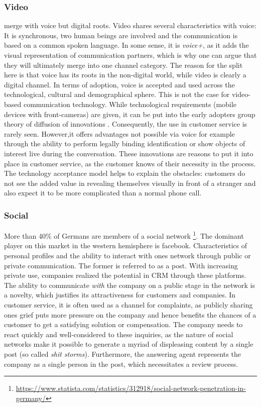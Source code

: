 		\subsubsection{Video}
		merge with voice but digital roots. 
		Video shares several characteristics with voice: It is synchronous, two human beings are involved and the communication is based on a common spoken language. In some sense, it is \textit{voice+}, as it adds the visual representation of communication partners, which is why one can argue that they will ultimately merge into one channel category. The reason for the split here is that voice has its roots in the non-digital world, while video is clearly a digital channel. In terms of adoption, voice is accepted and used across the technological, cultural and demographical sphere. This is not the case for video-based communication technology. While technological requirements (\ie mobile devices with front-cameras)  are given, it can be put into the early adopters group \wrt theory of diffusion of innovations \citep{rogers2010diffusion}. Consequently, the use in customer service is rarely seen. However,it offers advantages not possible via voice for example through the ability to perform legally binding identification or show objects of interest live during the conversation. These innovations are reasons to put it into place in customer service, as the customer knows of their necessity in the process. The technology acceptance model \citep{Adams_1992} helps to explain the obstacles: customers do not see the added value in revealing themselves visually in front of a stranger and also expect it to be more complicated than a normal phone call. 
		
		\subsubsection{Social}
		
		More than 40\% of Germans are members of a social network \footnote{\cf \url{https://www.statista.com/statistics/312918/social-network-penetration-in-germany/}}. The dominant player on this market in the western hemisphere is facebook. Characteristics of personal profiles and the ability to interact with ones network through public or private communication. The former is referred to as a post. With increasing private use, companies realized the potential in \acrshort{CRM} through these platforms. The ability to communicate \textit{with} the company on a public stage in the network is a novelty, which justifies its attractiveness for customers and companies. In customer service, it is often used as a channel for complaints, as publicly sharing ones grief puts more pressure on the company and hence benefits the chances of a customer to get a satisfying solution or compensation. The company needs to react quickly and well-considered to these inquiries, as the nature of social networks make it possible to generate a myriad of displeasing content by a single post (so called \textit{shit storms}). Furthermore, the answering agent represents the company as a single person in the post, which necessitates a review process. 
		
